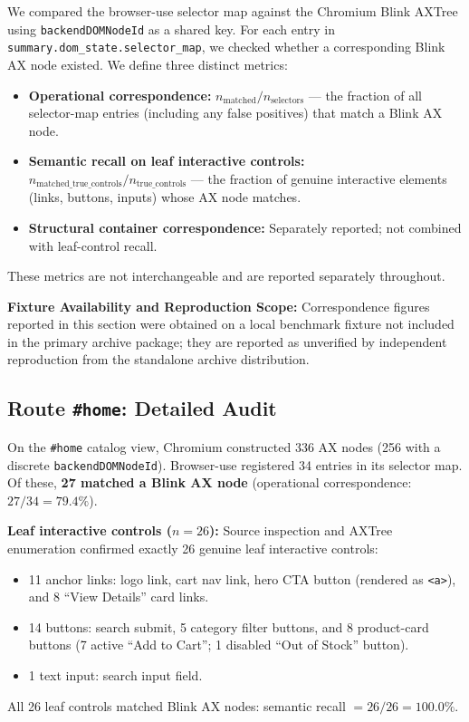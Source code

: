 \documentclass[conference]{IEEEtran}
\begin{document}
We compared the browser-use selector map against the Chromium Blink AXTree using \texttt{backendDOMNodeId} as a shared key. For each entry in \texttt{summary.dom\_state.selector\_map}, we checked whether a corresponding Blink AX node existed. We define three distinct metrics:
\begin{itemize}
    \item \textbf{Operational correspondence:} $n_{\mathrm{matched}} / n_{\mathrm{selectors}}$ --- the fraction of all selector-map entries (including any false positives) that match a Blink AX node.
    \item \textbf{Semantic recall on leaf interactive controls:} $n_{\mathrm{matched\_true\_controls}} / n_{\mathrm{true\_controls}}$ --- the fraction of genuine interactive elements (links, buttons, inputs) whose AX node matches.
    \item \textbf{Structural container correspondence:} Separately reported; not combined with leaf-control recall.
\end{itemize}
These metrics are not interchangeable and are reported separately throughout.

\textbf{Fixture Availability and Reproduction Scope:} Correspondence figures reported in this section were obtained on a local benchmark fixture not included in the primary archive package; they are reported as unverified by independent reproduction from the standalone archive distribution.

\subsection{Route \texttt{\#home}: Detailed Audit}

On the \texttt{\#home} catalog view, Chromium constructed 336 AX nodes (256 with a discrete \texttt{backendDOMNodeId}). Browser-use registered 34 entries in its selector map. Of these, \textbf{27 matched a Blink AX node} (operational correspondence: $27/34 = 79.4\%$).

\textbf{Leaf interactive controls ($n=26$):} Source inspection and AXTree enumeration confirmed exactly 26 genuine leaf interactive controls:
\begin{itemize}
    \item 11 anchor links: logo link, cart nav link, hero CTA button (rendered as \texttt{<a>}), and 8 ``View Details'' card links.
    \item 14 buttons: search submit, 5 category filter buttons, and 8 product-card buttons (7 active ``Add to Cart''; 1 disabled ``Out of Stock'' button).
    \item 1 text input: search input field.
\end{itemize}
All 26 leaf controls matched Blink AX nodes: semantic recall $= 26/26 = \mathbf{100.0\%}$.
\end{document}
